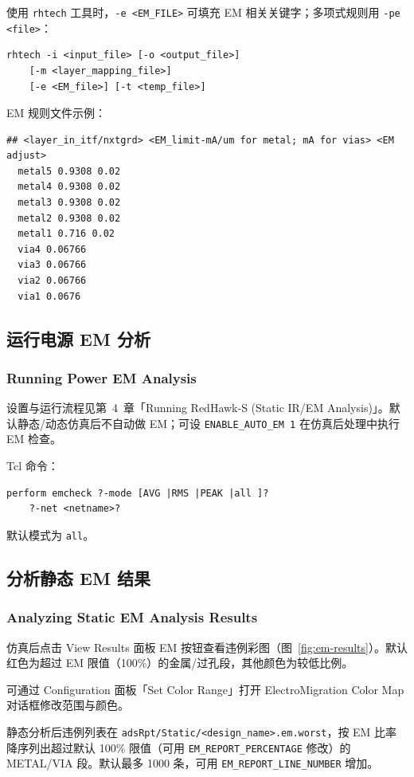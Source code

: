 使用 \texttt{rhtech} 工具时，\texttt{-e <EM\_FILE>} 可填充 EM 相关关键字；多项式规则用 \texttt{-pe <file>}：
\begin{lstlisting}
rhtech -i <input_file> [-o <output_file>]
    [-m <layer_mapping_file>]
    [-e <EM_file>] [-t <temp_file>]
\end{lstlisting}

EM 规则文件示例：
\begin{lstlisting}
## <layer_in_itf/nxtgrd> <EM_limit-mA/um for metal; mA for vias> <EM adjust>
  metal5 0.9308 0.02
  metal4 0.9308 0.02
  metal3 0.9308 0.02
  metal2 0.9308 0.02
  metal1 0.716 0.02
  via4 0.06766
  via3 0.06766
  via2 0.06766
  via1 0.0676
\end{lstlisting}

\subsection{运行电源 EM 分析}
\subsubsection*{Running Power EM Analysis}

设置与运行流程见第~4~章「Running RedHawk-S (Static IR/EM Analysis)」。默认静态/动态仿真后不自动做 EM；可设 \texttt{ENABLE\_AUTO\_EM 1} 在仿真后处理中执行 EM 检查。

Tcl 命令：
\begin{lstlisting}
perform emcheck ?-mode [AVG |RMS |PEAK |all ]?
    ?-net <netname>?
\end{lstlisting}
默认模式为 \texttt{all}。

\subsection{分析静态 EM 结果}
\subsubsection*{Analyzing Static EM Analysis Results}

仿真后点击 View Results 面板 EM 按钮查看违例彩图（图~\ref{fig:em-results}）。默认红色为超过 EM 限值（100\%）的金属/过孔段，其他颜色为较低比例。


可通过 Configuration 面板「Set Color Range」打开 ElectroMigration Color Map 对话框修改范围与颜色。

静态分析后违例列表在 \texttt{adsRpt/Static/<design\_name>.em.worst}，按 EM 比率降序列出超过默认 100\% 限值（可用 \texttt{EM\_REPORT\_PERCENTAGE} 修改）的 METAL/VIA 段。默认最多 1000 条，可用 \texttt{EM\_REPORT\_LINE\_NUMBER} 增加。

